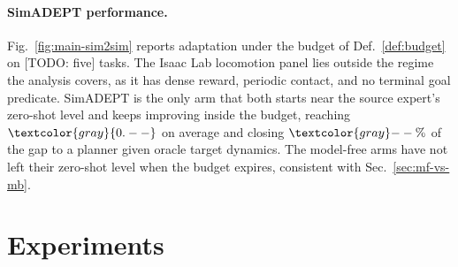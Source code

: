 \documentclass{article} %
\newcommand{\ph}[1]{\textcolor{gray}{#1}}   %
\begin{document}
\paragraph{SimADEPT performance.}
Fig.~\ref{fig:main-sim2sim} reports adaptation under the budget of Def.~\ref{def:budget} on [TODO: five] tasks. The Isaac Lab locomotion panel lies outside the regime the analysis covers, as it has dense reward, periodic contact, and no terminal goal predicate. SimADEPT is the only arm that both starts near the source expert's zero-shot level and keeps improving inside the budget, reaching $\ph{0.--}$ on average and closing $\ph{--\%}$ of the gap to a planner given oracle target dynamics. The model-free arms have not left their zero-shot level when the budget expires, consistent with Sec.~\ref{sec:mf-vs-mb}. 

\section{Experiments}
\label{exp}
\end{document}
